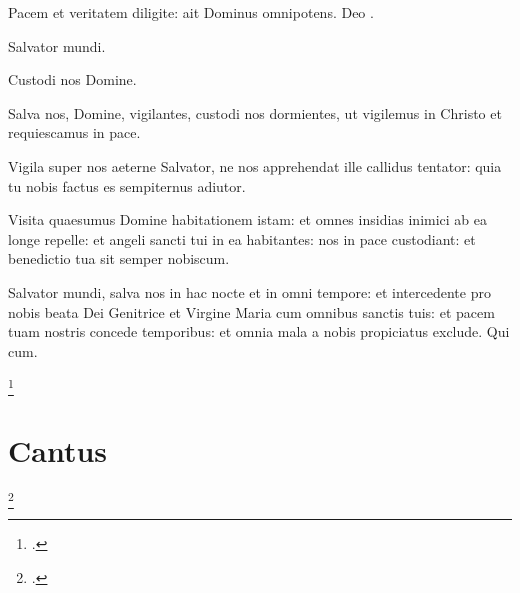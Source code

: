 

Pacem et veritatem diligite: ait Dominus omnipotens.
Deo .

 Salvator mundi.

 Custodi nos Domine.

Salva nos, Domine, vigilantes,
custodi nos dormientes,
ut vigilemus in Christo
et requiescamus in pace.


Vigila super nos aeterne Salvator,
ne nos apprehendat ille callidus tentator:
quia tu nobis factus es sempiternus adiutor.

Visita quaesumus Domine habitationem istam:
et omnes insidias inimici ab ea longe repelle:
et angeli sancti tui in ea habitantes:
nos in pace custodiant:
et benedictio tua sit semper nobiscum.

Salvator mundi, salva nos in hac nocte et in omni tempore:
et intercedente pro nobis beata Dei Genitrice et Virgine Maria
cum omnibus sanctis tuis:
et pacem tuam nostris concede temporibus:
et omnia mala a nobis propiciatus exclude.
Qui cum.

\footcite[121r]{bp1502}

\section{Cantus}


\footcite[81r]{xv_a_10}


